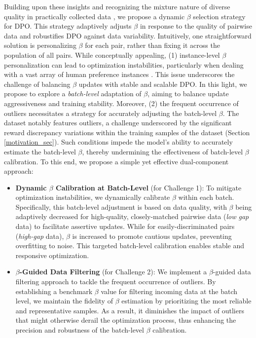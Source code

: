 Building upon these insights and recognizing the mixture nature of diverse quality in practically collected data \cite{mixture_data},
we propose a dynamic $\beta$ selection strategy for DPO. This strategy adaptively adjusts $\beta$ in response to the quality of pairwise data and robustifies DPO against data variability. 
Intuitively, one straightforward solution is personalizing $\beta$ for each pair, rather than fixing it across the population of all pairs. While conceptually appealing, (1) instance-level $\beta$ personalization can lead to optimization instabilities, particularly when dealing with a vast array of human preference instances . This issue underscores the challenge of balancing $\beta$ updates with stable and scalable DPO. In this light, we propose to explore a \textit{batch-level} adaptation of $\beta$, aiming to balance update aggressiveness and training stability. Moreover, (2) the frequent occurrence of outliers necessitates a strategy for accurately adjusting the batch-level $\beta$. 
The dataset notably features outliers, a challenge underscored by the significant reward discrepancy variations within the training samples of the dataset (\cf Section \ref{motivation_sec}). 
Such conditions impede the model's ability to accurately estimate the batch-level $\beta$, thereby undermining the effectiveness of batch-level $\beta$ calibration.
To this end, we propose a simple yet effective dual-component approach:


\begin{itemize}[leftmargin=*]
  \item \textbf{Dynamic $\beta$ Calibration at Batch-Level} (for Challenge 1): To mitigate optimization instabilities, we dynamically calibrate $\beta$ within each batch. Specifically, this batch-level adjustment is based on data quality, with $\beta$ being adaptively decreased for high-quality, closely-matched pairwise data (\ie \emph{low gap} data) to facilitate assertive updates. While for easily-discriminated pairs (\ie \emph{high-gap} data), $\beta$ is increased to promote cautious updates, preventing overfitting to noise.
  This targeted batch-level calibration enables stable and responsive optimization.
  \item \textbf{$\beta$-Guided Data Filtering} (for Challenge 2): We implement a $\beta$-guided data filtering approach to tackle the frequent occurrence of outliers. By establishing a benchmark $\beta$ value for filtering incoming data at the batch level, we maintain the fidelity of $\beta$ estimation by prioritizing the most reliable and representative samples. As a result, it diminishes the impact of outliers that might otherwise derail the optimization process, thus enhancing the precision and robustness of the batch-level $\beta$ calibration.
\end{itemize}

